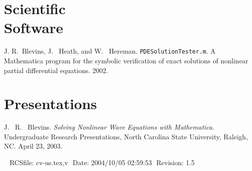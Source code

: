 \documentclass[margin,line,11pt,final]{res}
\begin{document}
\begin{resume}
\section{\sc Scientific \\Software}

J. R.\ Blevins, J. \ Heath, and W. \ Hereman.
  \texttt{PDESolutionTester.m}.  A Mathematica program for the symbolic
  verification of exact solutions of nonlinear partial differential
  equations. 2002.

\section{\sc Presentations}


J. \ R. \ Blevins. {\em Solving Nonlinear Wave Equations with
Mathematica}. Undergraduate Research Presentations, North Carolina
State University, Raleigh, NC. April 23, 2003.

\vspace{\fill}\ \newline
{\tiny \rm $ $RCSfile: cv-us.tex,v $ $ }
{\tiny \rm $ $Date: 2004/10/05 02:59:53 $ $ }
{\tiny \rm $ $Revision: 1.5 $ $ }


\end{resume}
\end{document}
